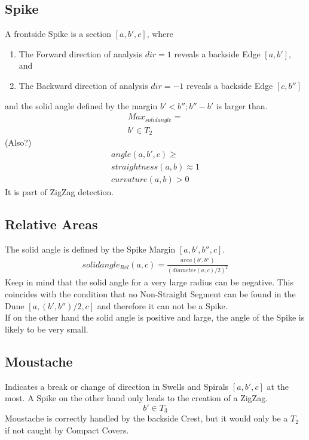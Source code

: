 \documentclass{report}
\begin{document}
\subsection{Spike}
A frontside Spike is a section $[a,b',c]$, where
\begin{enumerate}
\item The Forward direction of analysis $dir=1$ reveals a backside Edge $[a,b']$, and
\item The Backward direction of analysis $dir=-1$ reveals a backside Edge $[c,b'']$ 
\end{enumerate}
and the solid angle defined by the margin $b'<b'';b''-b'$ is larger than.\\
\begin{align}
Max_{solidangle}=\\
b' \in T_{2}
\end{align}
(Also?)
\begin{align}
angle(a,b',c)\geq\\
straightness(a,b)\approx 1\\
curvature(a,b)>0
\end{align}
It is part of ZigZag detection.

\subsection{Relative Areas}
The solid angle is defined by the Spike Margin $[a,b',b'',c]$.
\begin{align}
solidangle_{Rel}(a,c) = \frac{area(b',b'')}{(diameter(a,c)/2)^2}
\end{align}
Keep in mind that the solid angle for a very large radius can be negative. This coincides with the condition that no Non-Straight Segment can be found in the Dune $[a,(b',b'')/2,c]$ and therefore it can not be a Spike.\\
If on the other hand the solid angle is positive and large, the angle of the Spike is likely to be very small.

\subsection{Moustache}
Indicates a break or change of direction in Swells and Spirals $[a,b',c]$ at the most. A Spike on the other hand only leads to the creation of a ZigZag.
\begin{equation}
b' \in T_{3}
\end{equation}
Moustache is correctly handled by the backside Crest, but it would only be a $T_{2}$ if not caught by Compact Covers.
\end{document}
